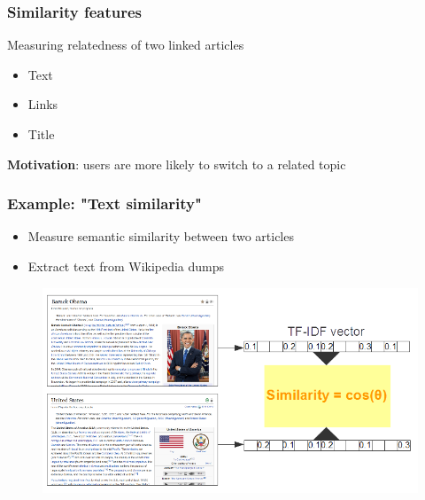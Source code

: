 \begin{frame}
  \frametitle{Similarity features}
  Measuring relatedness of two linked articles  
\begin{itemize}
\item Text
\item Links
\item Title
\end{itemize}
\textbf{Motivation}: users are more likely to switch to a related topic  
\end{frame}

\begin{frame}
  \frametitle{Example: "Text similarity"}
  \begin{itemize}
\item Measure semantic similarity between two articles 
\item Extract text from Wikipedia dumps
\end{itemize}

    \begin{figure}[h]
    \centering
   \includegraphics[height=0.75\textheight]{images/similarity}
  \end{figure}
\end{frame}

